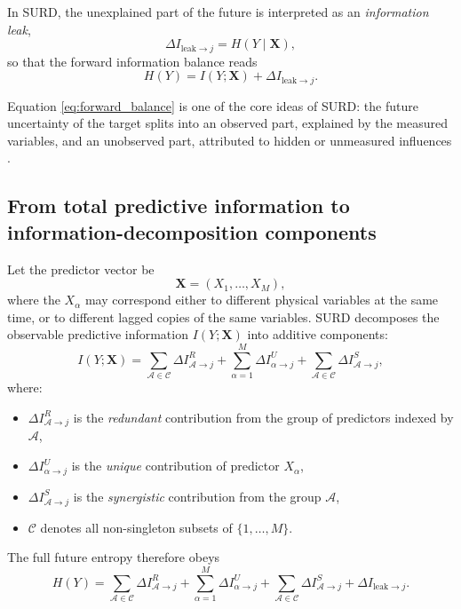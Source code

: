 \documentclass[fleqn,usenatbib]{mnras}
\begin{document}
In SURD, the unexplained part of the future is interpreted as an \emph{information leak},
\begin{equation}
\Delta I_{\mathrm{leak}\to j}=H(Y\mid \mathbf{X}),
\label{eq:leak_def}
\end{equation}
so that the forward information balance reads
\begin{equation}
H(Y)=I(Y;\mathbf{X})+\Delta I_{\mathrm{leak}\to j}.
\label{eq:forward_balance}
\end{equation}

Equation \eqref{eq:forward_balance} is one of the core ideas of SURD: the future uncertainty of the target splits into an observed part, explained by the measured variables, and an unobserved part, attributed to hidden or unmeasured influences \cite{MartinezSanchez2024SURD}.

\subsection{From total predictive information to information-decomposition components}

Let the predictor vector be
\begin{equation}
\mathbf{X} = (X_1,\ldots,X_M),
\end{equation}
where the \(X_\alpha\) may correspond either to different physical variables at the same time, or to different lagged copies of the same variables. SURD decomposes the observable predictive information \(I(Y;\mathbf{X})\) into additive components:
\begin{equation}
I(Y;\mathbf{X})
=
\sum_{\mathcal{A}\in\mathcal{C}} \Delta I_{\mathcal{A}\to j}^{R}
+
\sum_{\alpha=1}^{M} \Delta I_{\alpha\to j}^{U}
+
\sum_{\mathcal{A}\in\mathcal{C}} \Delta I_{\mathcal{A}\to j}^{S},
\label{eq:surd_master}
\end{equation}
where:
\begin{itemize}
    \item \(\Delta I_{\mathcal{A}\to j}^{R}\) is the \emph{redundant} contribution from the group of predictors indexed by \(\mathcal{A}\),
    \item \(\Delta I_{\alpha\to j}^{U}\) is the \emph{unique} contribution of predictor \(X_\alpha\),
    \item \(\Delta I_{\mathcal{A}\to j}^{S}\) is the \emph{synergistic} contribution from the group \(\mathcal{A}\),
    \item \(\mathcal{C}\) denotes all non-singleton subsets of \(\{1,\dots,M\}\).
\end{itemize}
The full future entropy therefore obeys
\begin{equation}
H(Y)=
\sum_{\mathcal{A}\in\mathcal{C}} \Delta I_{\mathcal{A}\to j}^{R}
+
\sum_{\alpha=1}^{M} \Delta I_{\alpha\to j}^{U}
+
\sum_{\mathcal{A}\in\mathcal{C}} \Delta I_{\mathcal{A}\to j}^{S}
+
\Delta I_{\mathrm{leak}\to j}.
\label{eq:full_surd_balance}
\end{equation}
\end{document}
